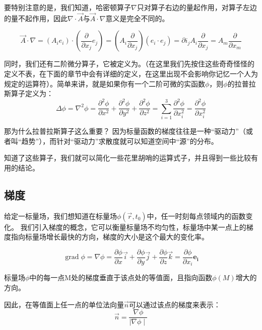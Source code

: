 \documentclass{ctexart}
\begin{document}
\par
要特别注意的是，我们知道，哈密顿算子$\nabla$只对算子右边的量起作用，对算子左边的量不起作用，因此$\nabla \cdot \vec{A}$与$\vec{A} \cdot \nabla$意义是完全不同的。

$$
    \vec{A} \cdot \nabla =\left(A_{i} e_{i}\right) \cdot\left(\frac{\partial}{\partial x_{j}} e_{j}\right) 
   =\left(A_{i} \frac{\partial}{\partial x_{j}}\right)\left(e_{i} \cdot e_{j}\right) 
   =\partial i_{j} A_{i} \frac{\partial}{\partial x_{j}}=A_{m} \frac{\partial}{\partial    x_{m}}
$$

同时，我们还有二阶微分算子，它被定义为。（在这里我们先按住这些奇奇怪怪的定义不表，在下面的章节中会有详细的定义，在这里出现不会影响你记忆一个人为规定的运算符）。简单来讲，就是如果你有一个二阶可微的实函数$\phi$，则$\phi$的拉普拉斯算子定义为：
$$
  \Delta \phi=\nabla^{2} \phi=\frac{\partial^{2} \phi}{\partial x^{2}}+\frac{\partial^{2} \phi}{\partial y^{2}}+\frac{\partial^{2} \phi}{\partial z^{2}}=\sum_{i=1}^{3} \frac{\partial^{2} \phi}{\partial x_{i}^{2}}=\frac{\partial^{2} \phi}{\partial x_{i}^{2}}
$$
\par
那为什么拉普拉斯算子这么重要？
因为标量函数的梯度往往是一种“驱动力”（或者叫“趋势”），而针对“驱动力”求散度就可以知道空间中“源”的分布。

\par
知道了这些算子，我们就可以简化一些花里胡哨的运算式子，并且得到一些比较有用的结论。



\subsection{梯度}
给定一标量场，我们想知道在标量场$\phi(\vec{r},t_0)$中，任一时刻每点领域内的函数变化。
我们引入梯度的概念，它可以衡量标量场不均匀性，标量场中某一点上的梯度指向标量场增长最快的方向，梯度的大小是这个最大的变化率。\par
{}
$$
\operatorname{grad} \phi=\nabla \phi=\frac{\partial \phi}{\partial x} \vec{i}+\frac{\partial \phi}{\partial y} \vec{j}+\frac{\partial \phi}{\partial z} \vec{k} =\frac{\partial \phi}{\partial {x}_{i}} \boldsymbol{e_{i}}
$$
\par
标量场$\phi$中的每一点M处的梯度垂直于该点处的等值面，且指向函数$\phi(M)$增大的方向。\par
因此，在等值面上任一点的单位法向量$\vec{n}$可以通过该点的梯度来表示：
$$
\vec{n}=\frac{\nabla \phi}{\mid \nabla \phi \mid} 
$$
\end{document}
